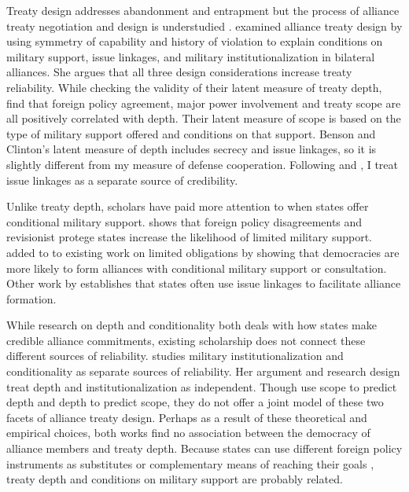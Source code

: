 \documentclass[12pt]{article}
\begin{document}
Treaty design addresses abandonment and entrapment but the process of alliance treaty negotiation and design is understudied \citep{Poast2019a}. 
\citet{Mattes2012} examined alliance treaty design by using symmetry of capability and history of violation to explain conditions on military support, issue linkages, and military institutionalization in bilateral alliances. 
She argues that all three design considerations increase treaty reliability.  
While checking the validity of their latent measure of treaty depth, \citet{BensonClinton2016} find that foreign policy agreement, major power involvement and treaty scope are all positively correlated with depth. 
Their latent measure of scope is based on the type of military support offered and conditions on that support. 
Benson and Clinton's latent measure of depth includes secrecy and issue linkages, so it is slightly different from my measure of defense cooperation. 
Following \citet{Mattes2012} and \citet{Poast2012}, I treat issue linkages as a separate source of credibility.


Unlike treaty depth, scholars have paid more attention to when states offer conditional military support. 
\citet{Benson2012} shows that foreign policy disagreements and revisionist protege states increase the likelihood of limited military support.
\citep{Chibaetal2015} added to to existing work on limited obligations by showing that democracies are more likely to form alliances with conditional military support or consultation. 
Other work by \citet{Poast2012, Poast2013} establishes that states often use issue linkages to facilitate alliance formation. 


While research on depth and conditionality both deals with how states make credible alliance commitments, existing scholarship does not connect these different sources of reliability.  
\citet{Mattes2012} studies military institutionalization and conditionality as separate sources of reliability. 
Her argument and research design treat depth and institutionalization as independent.
Though \citet{BensonClinton2016} use scope to predict depth and depth to predict scope, they do not offer a joint model of these two facets of alliance treaty design. 
Perhaps as a result of these theoretical and empirical choices, both works find no association between the democracy of alliance members and treaty depth. 
Because states can use different foreign policy instruments as substitutes or complementary means of reaching their goals \citep{Starr2000, MorganPalmer2000}, treaty depth and conditions on military support are probably related. 
\end{document}
